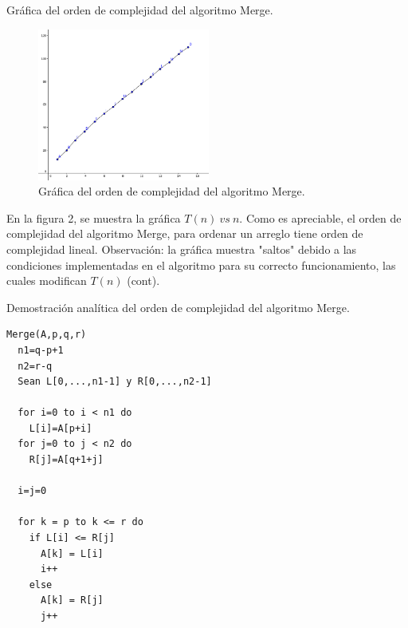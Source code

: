 \documentclass[12pt]{report}
\begin{document}
	Gráfica del orden de complejidad del algoritmo Merge.\\
	\begin{figure}[H]
		\includegraphics[height=5cm]{imagenes/output1_grafica.png}
		\centering
		\caption{Gráfica del orden de complejidad del algoritmo Merge.}
		\centering
	\end{figure}
	En la figura 2, se muestra la gráfica $T(n) \ vs \ n$. Como es apreciable, el orden de complejidad del algoritmo Merge, para ordenar un arreglo tiene orden de complejidad lineal. Observación: la gráfica muestra "saltos" debido a las condiciones implementadas en el algoritmo para su correcto funcionamiento, las cuales modifican $T(n)$ (cont). \newpage
	
	Demostración analítica del orden de complejidad del algoritmo Merge.\\
	
\lstset{language=C, breaklines=true, basicstyle=\footnotesize}
\lstset{numbers=left, numberstyle=\tiny, stepnumber=1, numbersep=10pt}
\begin{lstlisting}
Merge(A,p,q,r)
  n1=q-p+1
  n2=r-q
  Sean L[0,...,n1-1] y R[0,...,n2-1]

  for i=0 to i < n1 do
    L[i]=A[p+i]
  for j=0 to j < n2 do
    R[j]=A[q+1+j]

  i=j=0

  for k = p to k <= r do
    if L[i] <= R[j]
      A[k] = L[i]
      i++
    else 
      A[k] = R[j]
      j++

\end{lstlisting}
\end{document}
